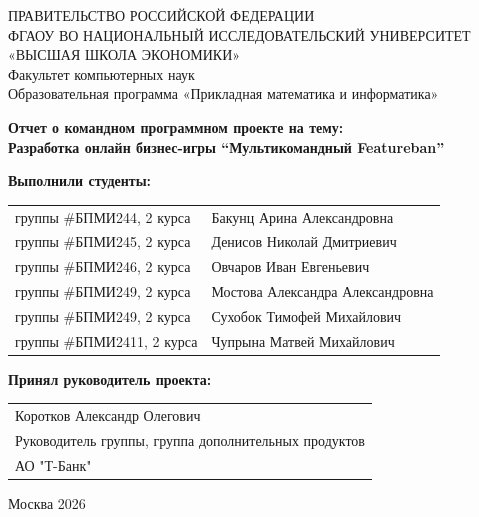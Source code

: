 \begin{titlepage}
	\newpage
	
	{
		\begin{center}
			ПРАВИТЕЛЬСТВО РОССИЙСКОЙ ФЕДЕРАЦИИ\\
			ФГАОУ ВО НАЦИОНАЛЬНЫЙ ИССЛЕДОВАТЕЛЬСКИЙ УНИВЕРСИТЕТ\\
			«ВЫСШАЯ ШКОЛА ЭКОНОМИКИ»
			\\
			\bigskip
			Факультет компьютерных наук\\
			Образовательная программа «Прикладная математика и информатика»
		\end{center}
	}
	
	\vspace{2em}
	\vspace{4em}
	
	\begin{center}
		{\bf Отчет о командном программном проекте на тему:}\\
		{\bf Разработка онлайн бизнес-игры “Мультикомандный Featureban”}\\
	\end{center}
	
	\vspace{2em}
	
	{\bf Выполнили студенты: \vspace{2mm}}
	
	{
		\begin{tabular}{l@{\hskip 1.5cm}l}
			группы \#БПМИ244, 2 курса & Бакунц Арина Александровна \\
			группы \#БПМИ245, 2 курса & Денисов Николай Дмитриевич \\
			группы \#БПМИ246, 2 курса & Овчаров Иван Евгеньевич \\
			группы \#БПМИ249, 2 курса & Мостова Александра Александровна \\
			группы \#БПМИ249, 2 курса & Сухобок Тимофей Михайлович \\
			группы \#БПМИ2411, 2 курса & Чупрына Матвей Михайлович
	\end{tabular}}
	
	\vspace{1em}
	{\bf Принял руководитель проекта: \vspace{2mm}}
	
	{
		\begin{tabular}{l}
			Коротков Александр Олегович\\
			Руководитель группы, группа дополнительных продуктов\\
			АО "Т-Банк"
	\end{tabular}}
	
	\vspace{\fill}
	
	\begin{center}
		Москва 2026
	\end{center}
	
\end{titlepage}